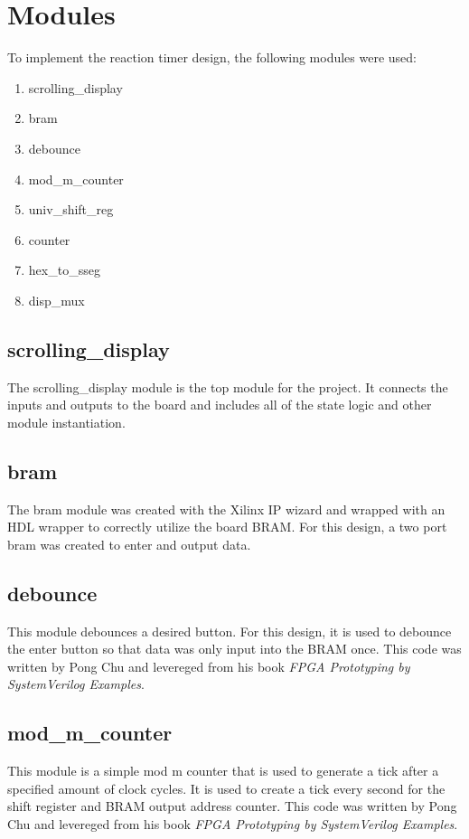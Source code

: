 \documentclass{article}
\begin{document}
\section{Modules}
To implement the reaction timer design, the following modules were used:
\begin{enumerate}
	\item scrolling\_display
	\item bram
	\item debounce
	\item mod\_m\_counter
	\item univ\_shift\_reg
	\item counter
	\item hex\_to\_sseg
	\item disp\_mux
\end{enumerate}

\subsection{scrolling\_display}
The scrolling\_display module is the top module for the project. It connects the inputs and outputs to the board and includes all of the state logic and other module instantiation.

\subsection{bram}
The bram module was created with the Xilinx IP wizard and wrapped with an HDL wrapper to correctly utilize the board BRAM. For this design, a two port bram was created to enter and output data. 

\subsection{debounce}
This module debounces a desired button. For this design, it is used to debounce the enter button so that data was only input into the BRAM once. This code was written by Pong Chu and levereged from his book \textit{FPGA Prototyping by SystemVerilog Examples}. 

\subsection{mod\_m\_counter}
This module is a simple mod m counter that is used to generate a tick after a specified amount of clock cycles. It is used to create a tick every second for the shift register and BRAM output address counter. This code was written by Pong Chu and levereged from his book \textit{FPGA Prototyping by SystemVerilog Examples}.
\end{document}
